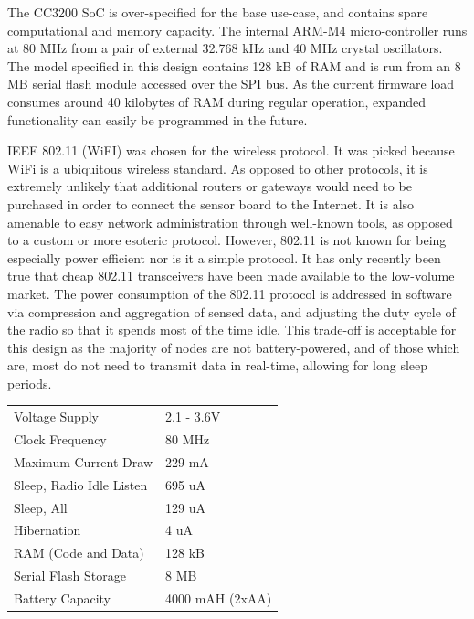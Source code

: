 The CC3200 SoC is over-specified for the base use-case, and contains spare computational and memory capacity. The internal ARM-M4 micro-controller runs at 80 MHz from a pair of external 32.768 kHz and 40 MHz crystal oscillators. The model specified in this design contains 128 kB of RAM and is run from an 8 MB serial flash module accessed over the SPI bus. As the current firmware load consumes around 40 kilobytes of RAM during regular operation, expanded functionality can easily be programmed in the future.

IEEE 802.11 (WiFI) was chosen for the wireless protocol. It was picked because WiFi is a ubiquitous wireless standard. As opposed to other protocols, it is extremely unlikely that additional routers or gateways would need to be purchased in order to connect the sensor board to the Internet. It is also amenable to easy network administration through well-known tools, as opposed to a custom or more esoteric protocol. However, 802.11 is not known for being especially power efficient nor is it a simple protocol. It has only recently been true that cheap 802.11 transceivers have been made available to the low-volume market. The power consumption of the 802.11 protocol is addressed in software via compression and aggregation of sensed data, and adjusting the duty cycle of the radio so that it spends most of the time idle. This trade-off is acceptable for this design as the majority of nodes are not battery-powered, and of those which are, most do not need to transmit data in real-time, allowing for long sleep periods.

\begin{table}[h]
\begin{tabular}{ll}
Voltage Supply           & 2.1 - 3.6V \\
Clock Frequency          & 80 MHz     \\
Maximum Current Draw     & 229 mA     \\
Sleep, Radio Idle Listen & 695 uA     \\
Sleep, All               & 129 uA \\
Hibernation              & 4 uA     \\
RAM (Code and Data)      & 128 kB     \\
Serial Flash Storage     & 8 MB		\\
Battery Capacity		 & 4000 mAH (2xAA)	      
\end{tabular}
\end{table}


